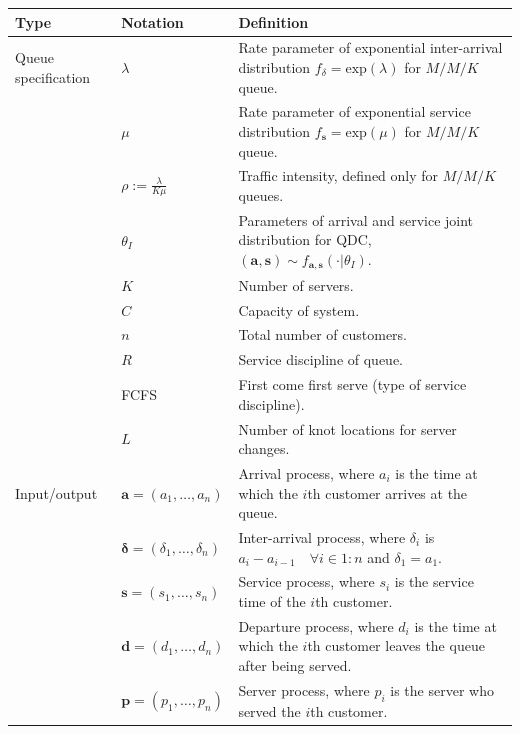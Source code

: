 \documentclass[article]{jss}
\begin{document}
\begin{table}
\centering
\begin{tabular}{llp{14cm}}
\hline
Type & Notation & Definition \\
\hline

Queue specification

& $\lambda$ & Rate parameter of exponential inter-arrival distribution $f_\delta = \text{exp}(\lambda)$ for $M/M/K$ queue. \\
& $\mu$ & Rate parameter of exponential service distribution $f_{\mathbf{s}} = \text{exp}(\mu)$ for $M/M/K$ queue.  \\
& $\rho := \frac{\lambda}{K \mu}$ & Traffic intensity, defined only for $M/M/K$ queues. \\ 
& $\theta_{I}$ & Parameters of arrival and service joint distribution for QDC, $(\mathbf{a}, \mathbf{s}) \sim f_{\mathbf{a}, \mathbf{s}}(\cdot | \theta_I )$. \\

& $K$ & Number of servers. \\
& $C$ & Capacity of system.  \\
& $n$ & Total number of customers. \\
& $R$ & Service discipline of queue. \\
& FCFS & First come first serve (type of service discipline). \\
& $L$ & Number of knot locations for server changes. \\

\hline

Input/output
& $\mathbf{a} = (a_1, \ldots, a_n )$ & Arrival process, where $a_i$ is the time at which the $i$th customer arrives at the queue. \\

& $\mathbf{\delta} = (\delta_1, \ldots, \delta_n )$ & Inter-arrival process, where $\delta_i$ is $a_i - a_{i-1} \quad \forall i \in 1:n$ and $\delta_1 = a_1$. \\

& $\mathbf{s} = (s_1, \ldots, s_n )$ & Service process, where $s_i$ is the service time of the $i$th customer. \\

& $\mathbf{d} = (d_1, \ldots, d_n )$ & Departure process, where $d_i$ is the time at which the $i$th customer leaves the queue after being served. \\

& $\mathbf{p} = (p_1, \ldots, p_n )$ & Server process, where $p_i$ is the server who served the $i$th customer. \\


\end{tabular}
\end{table}
\end{document}
